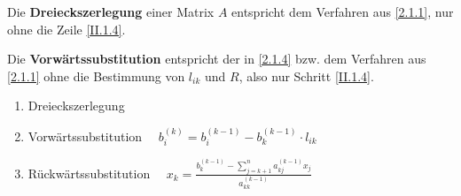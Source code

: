 \begin{Defe}
  \label{2.1.5}
  Die \textbf{Dreieckszerlegung} einer Matrix $A$
  entspricht dem Verfahren aus \ref{2.1.1}, nur ohne die Zeile \eqref{II.1.4}.
\end{Defe}

\begin{Defe}
  Die \textbf{Vorwärtssubstitution} entspricht der in \ref{2.1.4}
  bzw. dem Verfahren aus \ref{2.1.1} 
  ohne die Bestimmung von $l_{ik}$ und $R$, also nur Schritt \eqref{II.1.4}.
\end{Defe}

\begin{framed}
  \begin{enumerate}[1]
  \item Dreieckszerlegung
  \item Vorwärtssubstitution        $\quad b_i^{(k)} = b_i^{(k-1)} -b_k^{(k-1)} \cdot   l_{ik} $
  \item Rückwärtssubstitution      $\quad x_k = \frac{b_k^{(k-1)}-\sum_{j=k+1}^{n}a_{kj}^{(k-1)}x_j}{a_{kk}^{(k-1)}}$
  \end{enumerate}
\end{framed}


